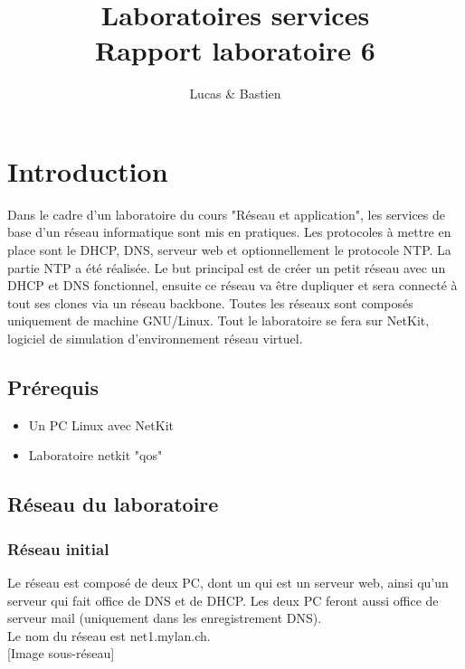 \documentclass{article}
\title{%
	Laboratoires services \\
	\large Rapport laboratoire 6
}
\author{\bsc{Bulloni} Lucas \& \bsc{Wermeille} Bastien}
\begin{document}
\maketitle

\newpage

\tableofcontents

\newpage

\section{Introduction}
	
Dans le cadre d'un laboratoire du cours "Réseau et application", les services de base d'un réseau informatique sont mis en pratiques. Les protocoles à mettre en place sont le DHCP, DNS, serveur web et optionnellement le protocole NTP. La partie NTP a été réalisée. Le but principal est de créer un petit réseau avec un DHCP et DNS fonctionnel, ensuite ce réseau va être dupliquer et sera connecté à tout ses clones via un réseau backbone. Toutes les réseaux sont composés uniquement de machine GNU/Linux. Tout le laboratoire se fera sur NetKit, logiciel de simulation d'environnement réseau virtuel.

\subsection{Prérequis}

\begin{itemize}
	\item Un PC Linux avec NetKit
	\item Laboratoire netkit "qos"
\end{itemize}
\subsection{Réseau du laboratoire}

\subsubsection{Réseau initial}

Le réseau est composé de deux PC, dont un qui est un serveur web, ainsi qu'un serveur qui fait office de DNS et de DHCP. Les deux PC feront aussi office de serveur mail (uniquement dans les enregistrement DNS).\\

Le nom du réseau est net1.mylan.ch.\\

[Image sous-réseau]
\end{document}
